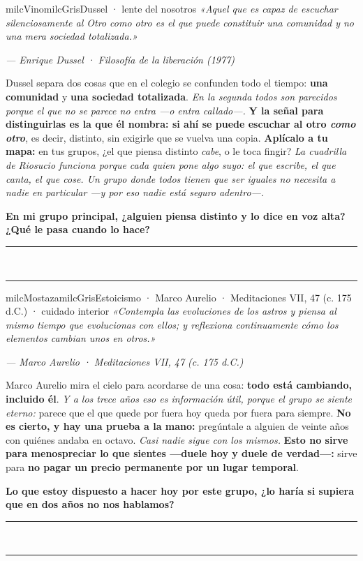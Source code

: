 \documentclass[11pt,letterpaper]{article}
\newcommand{\linead}[1]{\noindent\color{milcLinea}\rule{#1}{0.5pt}\color{milcNegro}}
\begin{document}
\begin{softbox}{milcVino}{milcGris}{Dussel · lente del nosotros}
\textit{«Aquel que es capaz de escuchar silenciosamente al Otro como otro es el que puede constituir una comunidad y no una mera sociedad totalizada.»}

{\footnotesize\itshape\color{milcNegro!70}--- Enrique Dussel · Filosofía de la liberación (1977)}

Dussel separa dos cosas que en el colegio se confunden todo el tiempo: \textbf{una comunidad} y \textbf{una sociedad totalizada}. \emph{En la segunda todos son parecidos porque el que no se parece no entra ---o entra callado---.} \textbf{Y la señal para distinguirlas es la que él nombra: si ahí se puede escuchar al otro \emph{como otro}}, es decir, distinto, sin exigirle que se vuelva una copia. \textbf{Aplícalo a tu mapa:} en tus grupos, ¿el que piensa distinto \emph{cabe}, o le toca fingir? \emph{La cuadrilla de Riosucio funciona porque cada quien pone algo suyo: el que escribe, el que canta, el que cose. Un grupo donde todos tienen que ser iguales no necesita a nadie en particular ---y por eso nadie está seguro adentro---.}

\textbf{En mi grupo principal, ¿alguien piensa distinto y lo dice en voz alta? ¿Qué le pasa cuando lo hace?}
\end{softbox}
\linead{\linewidth}\\[1mm]
\linead{\linewidth}

\begin{softbox}{milcMostaza}{milcGris}{Estoicismo · Marco Aurelio · Meditaciones VII, 47 (c. 175 d.C.) · cuidado interior}
\textit{«Contempla las evoluciones de los astros y piensa al mismo tiempo que evolucionas con ellos; y reflexiona continuamente cómo los elementos cambian unos en otros.»}

{\footnotesize\itshape\color{milcNegro!70}--- Marco Aurelio · Meditaciones VII, 47 (c. 175 d.C.)}

Marco Aurelio mira el cielo para acordarse de una cosa: \textbf{todo está cambiando, incluido él}. \emph{Y a los trece años eso es información útil, porque el grupo se siente eterno:} parece que el que quede por fuera hoy queda por fuera para siempre. \textbf{No es cierto, y hay una prueba a la mano:} pregúntale a alguien de veinte años con quiénes andaba en octavo. \emph{Casi nadie sigue con los mismos.} \textbf{Esto no sirve para menospreciar lo que sientes ---duele hoy y duele de verdad---:} sirve para \textbf{no pagar un precio permanente por un lugar temporal}.

\textbf{Lo que estoy dispuesto a hacer hoy por este grupo, ¿lo haría si supiera que en dos años no nos hablamos?}
\end{softbox}
\linead{\linewidth}\\[1mm]
\linead{\linewidth}
\end{document}
